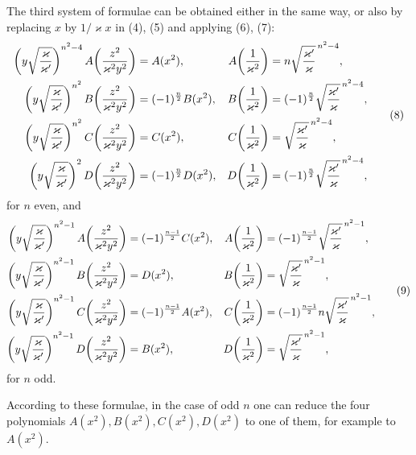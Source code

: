 \documentclass[11pt]{article}
\begin{document}
The third system of formulae can be obtained either in the same way, or also by replacing
$x$ by $1/\varkappa x$ in (4), (5) and applying (6), (7):
\begin{equation}
\begin{aligned}
\left(y\sqrt{\varkappa\over\varkappa'}\right)^{n^2-4}
 A\!\left({z^2\over\varkappa^2y^2}\right)&=A(x^2),
& A\!\left({1\over\varkappa^2}\right)&=n\sqrt{\varkappa'\over\varkappa}^{\,n^2-4},\\
\left(y\sqrt{\varkappa\over\varkappa'}\right)^{n^2}
 B\!\left({z^2\over\varkappa^2y^2}\right)&=(-1)^{\frac n2}B(x^2),
& B\!\left({1\over\varkappa^2}\right)&=(-1)^{\frac n2}\sqrt{\varkappa'\over\varkappa}^{\,n^2-4},\\
\left(y\sqrt{\varkappa\over\varkappa'}\right)^{n^2}
 C\!\left({z^2\over\varkappa^2y^2}\right)&=C(x^2),
& C\!\left({1\over\varkappa^2}\right)&=\sqrt{\varkappa'\over\varkappa}^{\,n^2-4},\\
\left(y\sqrt{\varkappa\over\varkappa'}\right)^2
 D\!\left({z^2\over\varkappa^2y^2}\right)&=(-1)^{\frac n2}D(x^2),
& D\!\left({1\over\varkappa^2}\right)&=(-1)^{\frac n2}\sqrt{\varkappa'\over\varkappa}^{\,n^2-4},
\end{aligned}
\tag{8}
\end{equation}
for $n$ even, and
\begin{equation}
\begin{aligned}
\left(y\sqrt{\varkappa\over\varkappa'}\right)^{n^2-1}
 A\!\left({z^2\over\varkappa^2y^2}\right)&=(-1)^{\frac{n-1}{2}}C(x^2),
& A\!\left({1\over\varkappa^2}\right)&=(-1)^{\frac{n-1}{2}}\sqrt{\varkappa'\over\varkappa}^{\,n^2-1},\\
\left(y\sqrt{\varkappa\over\varkappa'}\right)^{n^2-1}
 B\!\left({z^2\over\varkappa^2y^2}\right)&=D(x^2),
& B\!\left({1\over\varkappa^2}\right)&=\sqrt{\varkappa'\over\varkappa}^{\,n^2-1},\\
\left(y\sqrt{\varkappa\over\varkappa'}\right)^{n^2-1}
 C\!\left({z^2\over\varkappa^2y^2}\right)&=(-1)^{\frac{n-1}{2}}A(x^2),
& C\!\left({1\over\varkappa^2}\right)&=(-1)^{\frac{n-1}{2}}n\sqrt{\varkappa'\over\varkappa}^{\,n^2-1},\\
\left(y\sqrt{\varkappa\over\varkappa'}\right)^{n^2-1}
 D\!\left({z^2\over\varkappa^2y^2}\right)&=B(x^2),
& D\!\left({1\over\varkappa^2}\right)&=\sqrt{\varkappa'\over\varkappa}^{\,n^2-1},
\end{aligned}
\tag{9}
\end{equation}
for $n$ odd.

According to these formulae, in the case of odd $n$ one can reduce the four polynomials
$A(x^2),B(x^2),C(x^2),D(x^2)$ to one of them, for example to $A(x^2)$.
\end{document}
